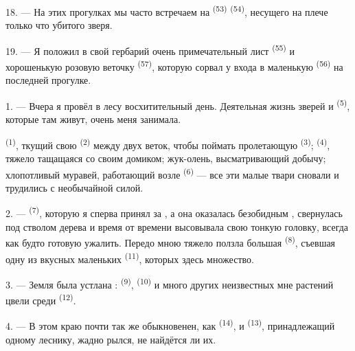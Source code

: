 18. --- На этих прогулках мы часто встречаем на 
\textsuperscript{(53)}  \textsuperscript{(54)}, несущего на
плече только что убитого зверя.

19. --- Я положил в свой гербарий очень примечательный лист
 \textsuperscript{(55)} и хорошенькую розовую веточку
 \textsuperscript{(57)}, которую сорвал у входа в маленькую
 \textsuperscript{(56)} на последней прогулке.

\VUsaut{3.0mm}
\VUsaut{3.0mm}

\VUsaut{3.0mm}

1. --- Вчера я провёл в лесу восхитительный день. Деятельная жизнь
зверей и  \textsuperscript{(5)}, которые там живут, очень меня
занимала.

 \textsuperscript{(1)}, ткущий свою  \textsuperscript{(2)}
между двух веток, чтобы поймать пролетающую  \textsuperscript{(3)};
 \textsuperscript{(4)}, тяжело тащащаяся со своим домиком; жук-олень,
высматривающий добычу; хлопотливый муравей, работающий возле
 \textsuperscript{(6)} --- все эти малые твари сновали и
трудились с необычайной силой.

2. ---  \textsuperscript{(7)}, которую я сперва принял за
, а она оказалась безобидным , свернулась под
стволом дерева и время от времени высовывала свою тонкую головку, всегда
как будто готовую ужалить. Передо мною тяжело ползла большая
 \textsuperscript{(8)}, съевшая одну из вкусных маленьких
 \textsuperscript{(11)}, которых здесь множество.

3. --- Земля была устлана : 
\textsuperscript{(9)},  \textsuperscript{(10)} и много других
неизвестных мне растений цвели среди 
\textsuperscript{(12)}.

4. --- В этом краю  почти так же обыкновенен, как
 \textsuperscript{(14)}, и  \textsuperscript{(13)},
принадлежащий одному леснику, жадно рылся, не найдётся ли их.

\VUsaut{3.0mm}
\VUsaut{3.0mm}

